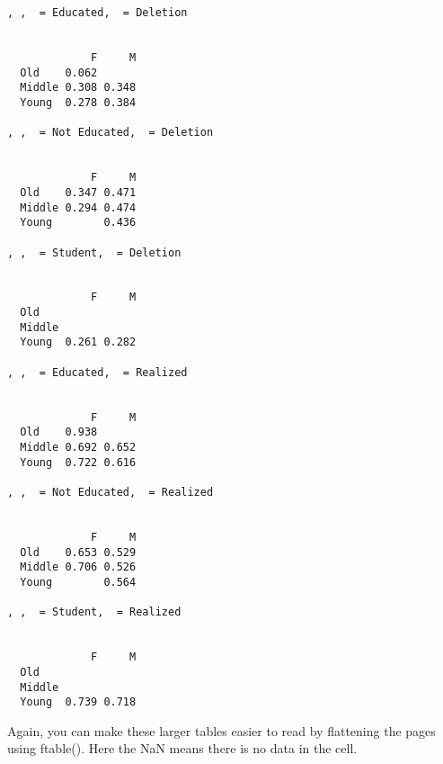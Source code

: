 \documentclass[
  12pt,
  letterpaper]{article}
\newenvironment{Shaded}{\begin{snugshade}}{\end{snugshade}}
\newcommand{\AttributeTok}[1]{\textcolor[rgb]{0.40,0.45,0.13}{#1}}
\newcommand{\CommentTok}[1]{\textcolor[rgb]{0.37,0.37,0.37}{#1}}
\newcommand{\DecValTok}[1]{\textcolor[rgb]{0.68,0.00,0.00}{#1}}
\newcommand{\FunctionTok}[1]{\textcolor[rgb]{0.28,0.35,0.67}{#1}}
\newcommand{\NormalTok}[1]{\textcolor[rgb]{0.00,0.23,0.31}{#1}}
\newcommand{\SpecialCharTok}[1]{\textcolor[rgb]{0.37,0.37,0.37}{#1}}
\renewcommand\texttt[1]{{\ttfamily\color{BrickRed}#1}}
\begin{document}
\begin{verbatim}
, ,  = Educated,  = Deletion

        
             F     M
  Old    0.062      
  Middle 0.308 0.348
  Young  0.278 0.384

, ,  = Not Educated,  = Deletion

        
             F     M
  Old    0.347 0.471
  Middle 0.294 0.474
  Young        0.436

, ,  = Student,  = Deletion

        
             F     M
  Old               
  Middle            
  Young  0.261 0.282

, ,  = Educated,  = Realized

        
             F     M
  Old    0.938      
  Middle 0.692 0.652
  Young  0.722 0.616

, ,  = Not Educated,  = Realized

        
             F     M
  Old    0.653 0.529
  Middle 0.706 0.526
  Young        0.564

, ,  = Student,  = Realized

        
             F     M
  Old               
  Middle            
  Young  0.739 0.718
\end{verbatim}

Again, you can make these larger tables easier to read by flattening the
pages using \texttt{ftable()}. Here the \texttt{NaN} means there is no
data in the cell.

\begin{Shaded}
\end{Shaded}
\end{document}
